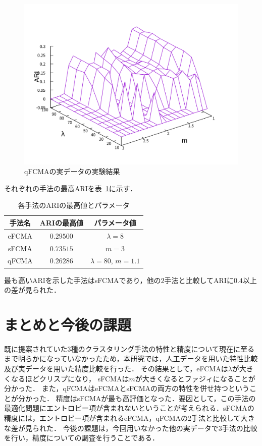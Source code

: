 \documentclass[twocolumn, a4paper]{icethesisabst}
\begin{document}
\begin{figure}[htbp]
\begin{minipage}{0.43\hsize}
  \includegraphics[width=\linewidth]{qFCMA_ARI.pdf}
  \caption{qFCMAの実データの実験結果}
  \label{fig:qFCMA_ARI}
 \end{minipage}
\end{figure}

それぞれの手法の最高ARIを表~\ref{tbl:max_ari}に示す．

\begin{table}[htbp]
 \centering
 \caption{各手法のARIの最高値とパラメータ}
  \begin{center}
   \begin{tabular}{ c || c | c }\hline
    手法名 & ARIの最高値 & パラメータ値\\ \hline \hline
    eFCMA & $0.29500$& $\lambda = 8$\\ \hline  
    sFCMA & $0.73515$ & $m = 3$\\ \hline
    qFCMA & $0.26286$ & $\lambda = 80$, $m = 1.1$\\  \hline
   \end{tabular}
   \label{tbl:max_ari}
  \end{center}
\end{table}

最も高いARIを示した手法はsFCMAであり，他の$2$手法と比較してARIに$0.4$以上の差が見られた．


\section{まとめと今後の課題}
既に提案されていた3種のクラスタリング手法の特性と精度について現在に至るまで明らかになっていなかったため，本研究では，人工データを用いた特性比較及び実データを用いた精度比較を行った．
その結果として，eFCMAは$\lambda$が大きくなるほどクリスプになり，
sFCMAは$m$が大きくなるとファジィになることが分かった．
また，qFCMAはeFCMAとsFCMAの両方の特性を併せ持つということが分かった．
精度はsFCMAが最も高評価となった．要因として，この手法の最適化問題にエントロピー項が含まれないということが考えられる．sFCMAの精度には，エントロピー項が含まれるeFCMA，qFCMAの2手法と比較して大きな差が見られた．
今後の課題は，今回用いなかった他の実データで$3$手法の比較を行い，精度についての調査を行うことである．
\end{document}

